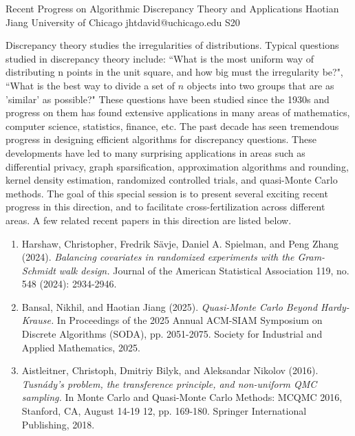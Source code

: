 \begin{session}
 {Recent Progress on Algorithmic Discrepancy Theory and Applications}%
 {Haotian Jiang}%
 {University of Chicago}%
 {jhtdavid@uchicago.edu}%
{}{}{}
 {S20}%
{}

 Discrepancy theory studies the irregularities of distributions. Typical questions studied in discrepancy theory include: ``What is the most uniform way of distributing n points in the unit square, and how big must the irregularity be?", ``What is the best way to divide a set of $n$ objects into two groups that are as 'similar' as possible?" These questions have been studied since the 1930s and progress on them has found extensive applications in many areas of mathematics, computer science, statistics, finance, etc.
 The past decade has seen tremendous progress in designing efficient algorithms for discrepancy questions. These developments have led to many surprising applications in areas such as differential privacy, graph sparsification, approximation algorithms and rounding, kernel density estimation, randomized controlled trials, and quasi-Monte Carlo methods.
 The goal of this special session is to present several exciting recent progress in this direction, and to facilitate cross-fertilization across different areas.
 \medskip
 A few related recent papers in this direction are listed below.
 \begin{enumerate}
 \item [{[1]}] Harshaw, Christopher, Fredrik S\"avje, Daniel A. Spielman, and Peng Zhang (2024). {\it Balancing covariates in randomized experiments with the Gram-Schmidt walk design.} Journal of the American Statistical Association 119, no. 548 (2024): 2934-2946.
 \item[{[2]}] Bansal, Nikhil, and Haotian Jiang (2025). {\it Quasi-Monte Carlo Beyond Hardy-Krause.} In Proceedings of the 2025 Annual ACM-SIAM Symposium on Discrete Algorithms (SODA), pp. 2051-2075. Society for Industrial and Applied Mathematics, 2025.
 \item [{[3]}] Aistleitner, Christoph, Dmitriy Bilyk, and Aleksandar Nikolov (2016). {\it Tusn\'ady’s problem, the transference principle, and non-uniform QMC sampling.} In Monte Carlo and Quasi-Monte Carlo Methods: MCQMC 2016, Stanford, CA, August 14-19 12, pp. 169-180. Springer International Publishing, 2018.
 \end{enumerate}
\end{session}

